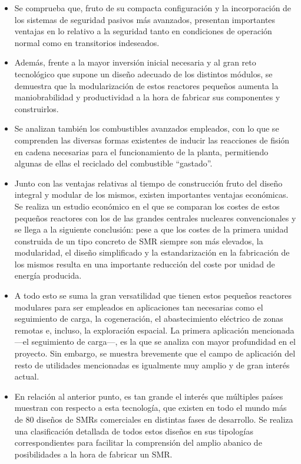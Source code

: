 \documentclass[a4paper, 11pt, spanish, twoside]{article}
\begin{document}
\begin{itemize}
    \item Se comprueba que, fruto de su compacta configuración y la incorporación de los sistemas de seguridad pasivos más avanzados, presentan importantes ventajas en lo relativo a la seguridad tanto en condiciones de operación normal como en transitorios indeseados.
    \item Además, frente a la mayor inversión inicial necesaria y al gran reto tecnológico que supone un diseño adecuado de los distintos módulos, se demuestra que la modularización de estos reactores pequeños aumenta la maniobrabilidad y productividad a la hora de fabricar sus componentes y construirlos.
    \item Se analizan también los combustibles avanzados empleados, con lo que se comprenden las diversas formas existentes de inducir las reacciones de fisión en cadena necesarias para el funcionamiento de la planta, permitiendo algunas de ellas el reciclado del combustible ``gastado''.
    \item Junto con las ventajas relativas al tiempo de construcción fruto del diseño integral y modular de los mismos, existen importantes ventajas económicas. Se realiza un estudio económico en el que se comparan los costes de estos pequeños reactores con los de las grandes centrales nucleares convencionales y se llega a la siguiente conclusión: pese a que los costes de la primera unidad construida de un tipo concreto de SMR siempre son más elevados, la modularidad, el diseño simplificado y la estandarización en la fabricación de los mismos resulta en una importante reducción del coste por unidad de energía producida.
    \item A todo esto se suma la gran versatilidad que tienen estos pequeños reactores modulares para ser empleados en aplicaciones tan necesarias como el seguimiento de carga, la cogeneración, el abastecimiento eléctrico de zonas remotas e, incluso, la exploración espacial. La primera aplicación mencionada ---el seguimiento de carga---, es la que se analiza con mayor profundidad en el proyecto. Sin embargo, se muestra brevemente que el campo de aplicación del resto de utilidades mencionadas es igualmente muy amplio y de gran interés actual.
    \item En relación al anterior punto, es tan grande el interés que múltiples países muestran con respecto a esta tecnología, que existen en todo el mundo más de 80 diseños de SMRs comerciales en distintas fases de desarrollo. Se  realiza una clasificación detallada de todos estos diseños en sus tipologías correspondientes para facilitar la comprensión del amplio abanico de posibilidades a la hora de fabricar un SMR.
    

\end{itemize}
\end{document}
